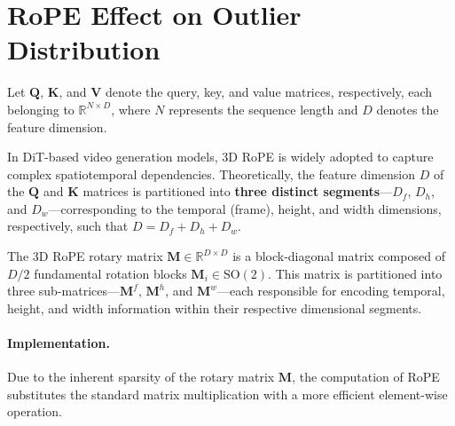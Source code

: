 



\section{RoPE Effect on Outlier Distribution}\label{sec:outlier_analy}

Let $\mathbf{Q}$, $\mathbf{K}$, and $\mathbf{V}$ denote the query, key, and value matrices, respectively, each belonging to $\mathbb{R}^{N \times D}$, where $N$ represents the sequence length and $D$ denotes the feature dimension.

In DiT-based video generation models, 3D RoPE is widely adopted to capture complex spatiotemporal dependencies. Theoretically, the feature dimension $D$ of the $\mathbf{Q}$ and $\mathbf{K}$ matrices is partitioned into \textbf{three distinct segments}---$D_{f}$, $D_{h}$, and $D_{w}$---corresponding to the temporal (frame), height, and width dimensions, respectively, such that $D=D_{f}+D_{h}+D_{w}$.

The 3D RoPE rotary matrix $\mathbf{M} \in \mathbb{R}^{D \times D}$ is a block-diagonal matrix 
composed of $D/2$ fundamental rotation blocks $\mathbf{M}_i \in \mathrm{SO}(2)$. 
This matrix is partitioned into three sub-matrices—$\mathbf{M}^f$, $\mathbf{M}^h$, and 
$\mathbf{M}^w$—each responsible for encoding temporal, height, and width information 
within their respective dimensional segments.




\paragraph{\textbf{Implementation.}} 
Due to the inherent sparsity of the rotary matrix $\mathbf{M}$, the computation of RoPE substitutes the standard matrix multiplication with a more efficient element-wise operation.

